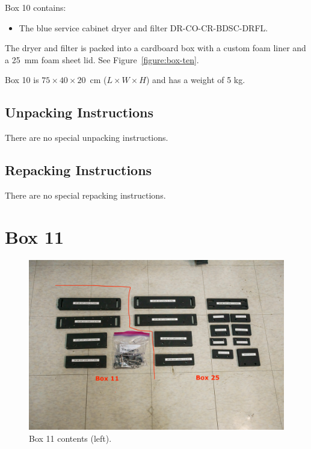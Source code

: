 \documentclass{article}
\begin{document}
Box 10 contains:

\begin{itemize}
    \item The blue service cabinet dryer and filter DR-CO-CR-BDSC-DRFL.
\end{itemize}

The dryer and filter is packed into a cardboard box with a custom foam liner and a 25~mm foam sheet lid. See Figure~\ref{figure:box-ten}.

Box 10 is $75 \times 40 \times 20$~cm ($L \times W \times H$) and has a weight of 5 kg.

\subsection{Unpacking Instructions}

There are no special unpacking instructions.

\subsection{Repacking Instructions}

There are no special repacking instructions.


\clearpage
\section{Box 11}

\begin{figure}[bp]
\begin{center}
\includegraphics[width=0.80\linewidth]{figures/20201208T175508.jpg}
\end{center}
\caption{Box 11 contents (left).}
\label{figure:box-eleven-contents}
\end{figure}
\end{document}
